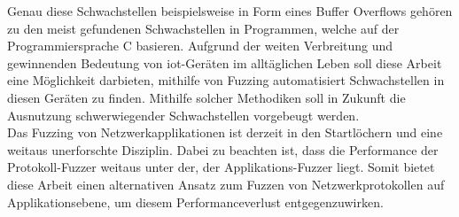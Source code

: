 Genau diese Schwachstellen beispielsweise in Form eines Buffer Overflows gehören zu den meist gefundenen Schwachstellen in
Programmen, welche auf der Programmiersprache C basieren.
Aufgrund der weiten Verbreitung und gewinnenden Bedeutung von \gls{iot}-Geräten im alltäglichen Leben soll diese Arbeit
eine Möglichkeit darbieten, mithilfe von Fuzzing automatisiert Schwachstellen in diesen Geräten zu finden.
Mithilfe solcher Methodiken soll in Zukunft die Ausnutzung schwerwiegender Schwachstellen vorgebeugt werden.\\
\linebreak
Das Fuzzing von Netzwerkapplikationen ist derzeit in den Startlöchern und eine weitaus unerforschte Disziplin.
Dabei zu beachten ist, dass die Performance der Protokoll-Fuzzer weitaus unter der, der Applikations-Fuzzer liegt.
Somit bietet diese Arbeit einen alternativen Ansatz zum Fuzzen von Netzwerkprotokollen auf Applikationsebene, um diesem
Performanceverlust entgegenzuwirken.